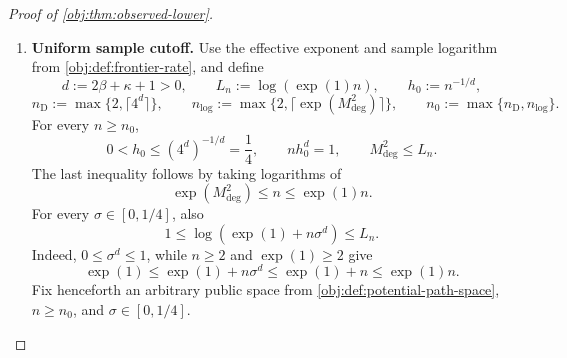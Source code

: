 \begin{proof}[Proof of \cref{obj:thm:observed-lower}]
\begin{enumerate}
Define the design coefficient and three comparison constants by
\[
c_\kappa:=(\kappa+1)2^\kappa,\qquad
B_{\mathrm D}:=8c_\kappa,\qquad
B_{\mathrm I}:=4\exp(1/2)(c_\kappa C_{\mathrm{packet}})^2,\qquad
B_{\mathrm G}:=4\exp(1/2)(2c_\kappa)^2,
\]
and set
\[
B_{\mathrm{amp}}:=\max\{B_{\mathrm D},2B_{\mathrm I}\},\qquad
\varepsilon:=
\min\left\{
\frac18,\frac{1}{8C_{\mathrm{packet}}},
\sqrt{\frac{\log(1+\tau^2)}{B_{\mathrm{amp}}}}
\right\}.
\]
These constants are positive. The amplitude satisfies
\[
\varepsilon\le\frac18,\qquad
4\varepsilon\le1,\qquad
\varepsilon C_{\mathrm{packet}}\le\frac18,
\]
\[
B_{\mathrm D}\varepsilon^2\le\log(1+\tau^2),
\qquad
2B_{\mathrm I}\varepsilon^2\le\log(1+\tau^2).
\]
Finally, choose
\[
C:=\varepsilon^2\max\{B_{\mathrm G},B_{\mathrm I}\},
\qquad
c:=2\varepsilon\min\left\{
1,
\left(\frac{a_{\mathrm I}}{\sqrt{C_{\mathrm I}+1}}\right)^\beta,
\left(\frac{\ell_{\mathrm M}}{2C_{\mathrm M}}\right)^\beta
\right\}.
\]
Both are positive, and these definitions give the comparison constants required in each regime.

\item \textbf{Uniform sample cutoff.}
Use the effective exponent and sample logarithm from \cref{obj:def:frontier-rate}, and define
\[
d:=2\beta+\kappa+1>0,\qquad
L_n:=\log(\exp(1)n),\qquad h_0:=n^{-1/d},
\]
\[
n_{\mathrm D}:=\max\{2,\lceil4^d\rceil\},\qquad
n_{\log}:=\max\{2,\lceil\exp(M_{\mathrm{deg}}^2)\rceil\},
\qquad
n_0:=\max\{n_{\mathrm D},n_{\log}\}.
\]
For every \(n\ge n_0\),
\[
0<h_0\le(4^d)^{-1/d}=\frac14,\qquad
nh_0^d=1,\qquad
M_{\mathrm{deg}}^2\le L_n.
\]
The last inequality follows by taking logarithms of
\[
\exp(M_{\mathrm{deg}}^2)\le n\le\exp(1)n.
\]
For every \(\sigma\in[0,1/4]\), also
\[
1\le\log(\exp(1)+n\sigma^d)\le L_n.
\]
Indeed, \(0\le\sigma^d\le1\), while \(n\ge2\) and \(\exp(1)\ge2\) give
\[
\exp(1)\le\exp(1)+n\sigma^d
\le\exp(1)+n\le\exp(1)n.
\]
Fix henceforth an arbitrary public space from \cref{obj:def:potential-path-space}, \(n\ge n_0\), and \(\sigma\in[0,1/4]\).


\end{enumerate}
\end{proof}
